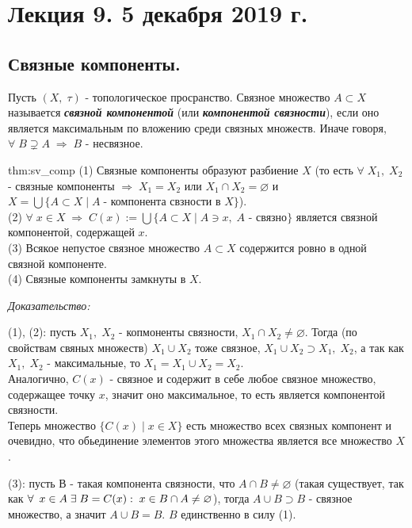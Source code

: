 \documentclass[../../main.tex]{subfiles}
\begin{document}
\section{Лекция 9. 5 декабря 2019 г.}

\subsection{Связные компоненты.}
 Пусть $(X,\;\tau)$ - топологическое просранство. Связное множество $A\subset X$ называется \textbf{\textit{связной компонентой}} (или \textbf{\textit{компонентой связности}}), если оно является максимальным по вложению среди связных множеств. Иначе говоря, $\forall\; B\supsetneq A\; \Rightarrow\; B$ - несвязное. 

\begin{theo}{thm:sv_comp}
(1) Связные компоненты образуют разбиение $X$ (то есть $\forall\; X_1,\; X_2$ - связные компоненты $\Rightarrow\; X_1 = X_2$ или $X_1\cap X_2 = \varnothing$ и $X = \bigcup \{A\subset X\; |\;A\; \text{- компонента свзности в }X \} $).\\
(2) $\forall\; x\in X\; \Rightarrow\; C(x):=\bigcup\{A\subset X\; |\; A\ni x,\; A\text{ - связно}\}$ является связной компонентой, содержащей $x$.\\
(3) Всякое непустое связное множество $A\subset X$ содержится ровно в одной связной компоненте.\\
(4) Связные компоненты замкнуты в $X$.
\end{theo}
\textit{Доказательство:}

(1), (2): пусть $X_1,\; X_2$ - копмоненты связности, $X_1\cap X_2 \neq \varnothing$. Тогда (по свойствам свяных множеств) $X_1\cup X_2$ тоже связное, $X_1\cup X_2 \supset X_1,\; X_2$, а так как $X_1,\; X_2$ - максимальные, то $X_1 = X_1\cup X_2 = X_2$.\\
Аналогично,  $C(x)$ - связное и содержит в себе любое связное множество, содержащее точку $x$, значит оно максимальное, то есть является компонентой связности.\\
Теперь множество $ \{C(x)\; |\; x\in X\}$ есть множество всех связных компонент и очевидно, что обьединение элементов этого множества является все множество $X$. 

(3): пусть В - такая компонента связности, что $A\cap B \neq \varnothing$ (такая существует, так как $\forall\:\; x\in A\; \exists\; B = C(x):\; x\in B\cap A\neq \varnothing$), тогда $A\cup B\supset B$ - связное множество, а значит $A\cup B = B$. $B$ единственно в силу (1).
\end{document}
